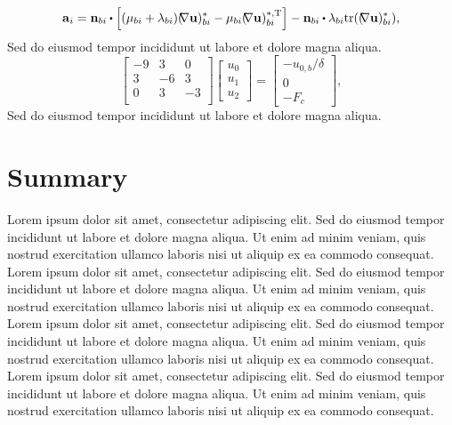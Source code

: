 %
\begin{equation}
\vec{a}_i =  \vec{n}_{bi} \cdot \left[(\mu_{bi}+\lambda_{bi})(\grad \vec{u})_{bi}^*-\mu_{bi} (\grad \vec{u})^{*,\transpose}_{bi}\right] - \vec{n}_{bi}\cdot \lambda_{bi} \tr ((\grad \vec{u})^*_{bi})  ,
\label{eq:ic:A}
\end{equation}
%
Sed do eiusmod tempor incididunt ut labore et dolore magna aliqua. 
%
\begin{equation}
\begin{bmatrix}
-9 & 3 & 0  \\
3 & -6 & 3  \\
0 & 3 & -3\\
\end{bmatrix}
\begin{bmatrix}
u_0 \\ u_1 \\u_2
\end{bmatrix}
=
\begin{bmatrix}
-u_{0,b}/\delta \\ 0 \\ -F_c
\end{bmatrix},
\label{eq:1dbarSoE}
\end{equation}
%
Sed do eiusmod tempor incididunt ut labore et dolore magna aliqua. 
%
%
\section{Summary}
\label{sec:Metho:closure}
%
%
Lorem ipsum dolor sit amet, consectetur adipiscing elit. 
Sed do eiusmod tempor incididunt ut labore et dolore magna aliqua. 
Ut enim ad minim veniam, quis nostrud exercitation ullamco laboris nisi ut aliquip ex ea commodo consequat.
Lorem ipsum dolor sit amet, consectetur adipiscing elit. 
Sed do eiusmod tempor incididunt ut labore et dolore magna aliqua. 
Ut enim ad minim veniam, quis nostrud exercitation ullamco laboris nisi ut aliquip ex ea commodo consequat.
Lorem ipsum dolor sit amet, consectetur adipiscing elit. 
Sed do eiusmod tempor incididunt ut labore et dolore magna aliqua. 
Ut enim ad minim veniam, quis nostrud exercitation ullamco laboris nisi ut aliquip ex ea commodo consequat.
Lorem ipsum dolor sit amet, consectetur adipiscing elit. 
Sed do eiusmod tempor incididunt ut labore et dolore magna aliqua. 
Ut enim ad minim veniam, quis nostrud exercitation ullamco laboris nisi ut aliquip ex ea commodo consequat.
%
%
